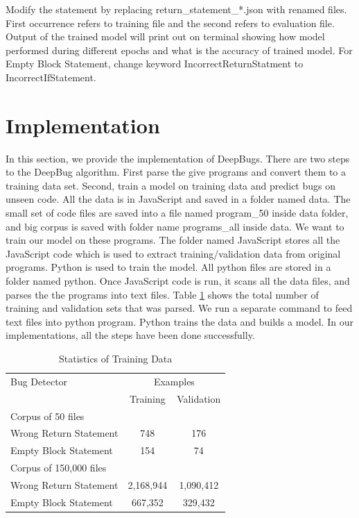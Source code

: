 \documentclass[sigconf]{acmart}
\begin{document}
Modify the statement by replacing return\_statement\_*.json with renamed files.
First occurrence refers to training file and the second refers to evaluation file. Output of the trained model will print out on terminal showing how model performed during different epochs and what is the accuracy of trained model. For Empty Block Statement, change keyword IncorrectReturnStatment to IncorrectIfStatement. 
\fi


\section{Implementation}
In this section, we provide the implementation of DeepBugs. There are two steps to the DeepBug algorithm. First parse the give programs and convert them to a training data set. Second, train a model on training data and predict bugs on unseen code. All the data is in JavaScript and saved in a folder named data.  The small set of code files are saved into a file named program\_50 inside data folder, and big corpus is saved with folder name programs\_all inside data. We want to train our model on these programs. The folder named JavaScript stores all the JavaScript code which is used to extract training/validation data from original programs. Python is used to train the model. All python files are stored in a folder named python. Once JavaScript code is run, it scans all the data files, and parses the the programs into text files. Table \ref{tab: training_data_Table} shows the total number of training and validation sets that was parsed.
We run a separate command to feed text files into python program. Python trains the data and builds a model. In our implementations, all the steps have been done successfully.


\begin{table}[h!]
\begin{tabular}{l cc}
\toprule
Bug Detector & \multicolumn{2}{c}{Examples} \\
\cline{2-3}
 & Training & Validation \\
 \hline
 \hline
Corpus of 50 files & & & \\
Wrong Return Statement  & 748 & 176 \\
Empty Block Statement & 154 & 74  \\
\hline
Corpus of 150,000 files & & & \\
Wrong Return Statement  & 2,168,944 & 1,090,412 \\
Empty Block Statement & 667,352 & 329,432  \\
\bottomrule
\end{tabular}
\caption{Statistics of Training Data}
\label{tab: training_data_Table}
\end{table} 
\end{document}
